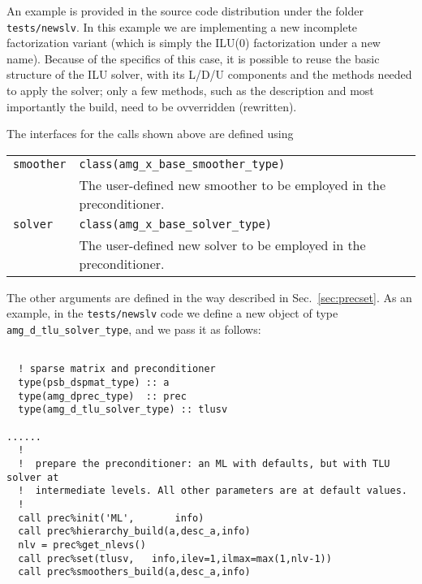 An example is provided in the source code distribution under the
folder \verb|tests/newslv|. In this example we are implementing a new
incomplete factorization variant (which is simply the ILU(0)
factorization under a new name). Because of the specifics of  this case, it is
possible to reuse the basic structure of the ILU solver, with its
L/D/U components and the methods needed to apply the solver; only a
few methods, such as the description and most importantly the build,
need to be ovverridden (rewritten).

The interfaces for the calls shown above are defined using
\begin{center}
\begin{tabular}{p{1.4cm}p{12cm}}
\verb|smoother| & \verb|class(amg_x_base_smoother_type)| \\
              & The user-defined new smoother to be employed in the
                preconditioner.\\
\verb|solver| & \verb|class(amg_x_base_solver_type)| \\
              & The user-defined new solver to be employed in the
                preconditioner.
\end{tabular}
\end{center}
The other arguments are defined in the way described in
Sec.~\ref{sec:precset}.  As an example, in  the \verb|tests/newslv|
code we define a new object of type \verb|amg_d_tlu_solver_type|, and
we pass it as follows:
\begin{verbatim}

  ! sparse matrix and preconditioner
  type(psb_dspmat_type) :: a
  type(amg_dprec_type)  :: prec
  type(amg_d_tlu_solver_type) :: tlusv

......
  !
  !  prepare the preconditioner: an ML with defaults, but with TLU solver at
  !  intermediate levels. All other parameters are at default values.
  !
  call prec%init('ML',       info)
  call prec%hierarchy_build(a,desc_a,info)
  nlv = prec%get_nlevs()
  call prec%set(tlusv,   info,ilev=1,ilmax=max(1,nlv-1))
  call prec%smoothers_build(a,desc_a,info)

\end{verbatim}
